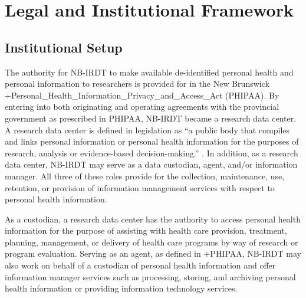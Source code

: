 \documentclass[
]{book}
\begin{document}
\hypertarget{legal-and-institutional-framework-2}{%
\section{Legal and Institutional Framework}\label{legal-and-institutional-framework-2}}

\hypertarget{institutional-setup-2}{%
\subsection{Institutional Setup}\label{institutional-setup-2}}

The authority for NB-IRDT to make available de-identified personal health and personal information to researchers is provided for in the New Brunswick +Personal\_Health\_Information\_Privacy\_and\_Access\_Act\textbar{} (PHIPAA). By entering into both originating and operating agreements with the provincial government as prescribed in PHIPAA, NB-IRDT became a research data center. A research data center is defined in legislation as ``a public body that compiles and links personal information or personal health information for the purposes of research, analysis or evidence-based decision-making.'' \citep{governmentofnewbrunswick2009}. In addition, as a research data center, NB-IRDT may serve as a data custodian, agent, and/or information manager. All three of these roles provide for the collection, maintenance, use, retention, or provision of information management services with respect to personal health information.

As a custodian, a research data center has the authority to access personal health information for the purpose of assisting with health care provision, treatment, planning, management, or delivery of health care programs by way of research or program evaluation. Serving as an agent, as defined in +PHIPAA\textbar, NB-IRDT may also work on behalf of a custodian of personal health information and offer information manager services such as processing, storing, and archiving personal health information or providing information technology services.
\end{document}
